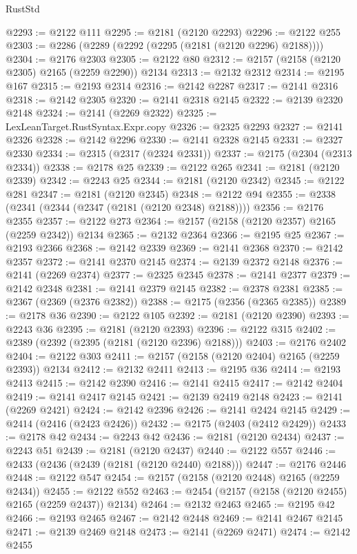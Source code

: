 \begin{lexlean}{RustStd}
\begin{coremodule}
@2293 := @2122 @111
@2295 := @2181 (@2120 @2293)
@2296 := @2122 @255
@2303 := @2286 (@2289 (@2292 (@2295 (@2181 (@2120 @2296) @2188))))
@2304 := @2176 @2303
@2305 := @2122 @80
@2312 := @2157 (@2158 (@2120 @2305) @2165 (@2259 @2290)) @2134
@2313 := @2132 @2312
@2314 := @2195 @167
@2315 := @2193 @2314
@2316 := @2142 @2287
@2317 := @2141 @2316
@2318 := @2142 @2305
@2320 := @2141 @2318 @2145
@2322 := @2139 @2320 @2148
@2324 := @2141 (@2269 @2322)
@2325 := LexLeanTarget.RustSyntax.Expr.copy
@2326 := @2325 @2293
@2327 := @2141 @2326
@2328 := @2142 @2296
@2330 := @2141 @2328 @2145
@2331 := @2327 @2330
@2334 := @2315 (@2317 (@2324 @2331))
@2337 := @2175 (@2304 (@2313 @2334))
@2338 := @2178 @25
@2339 := @2122 @265
@2341 := @2181 (@2120 @2339)
@2342 := @2243 @25
@2344 := @2181 (@2120 @2342)
@2345 := @2122 @281
@2347 := @2181 (@2120 @2345)
@2348 := @2122 @94
@2355 := @2338 (@2341 (@2344 (@2347 (@2181 (@2120 @2348) @2188))))
@2356 := @2176 @2355
@2357 := @2122 @273
@2364 := @2157 (@2158 (@2120 @2357) @2165 (@2259 @2342)) @2134
@2365 := @2132 @2364
@2366 := @2195 @25
@2367 := @2193 @2366
@2368 := @2142 @2339
@2369 := @2141 @2368
@2370 := @2142 @2357
@2372 := @2141 @2370 @2145
@2374 := @2139 @2372 @2148
@2376 := @2141 (@2269 @2374)
@2377 := @2325 @2345
@2378 := @2141 @2377
@2379 := @2142 @2348
@2381 := @2141 @2379 @2145
@2382 := @2378 @2381
@2385 := @2367 (@2369 (@2376 @2382))
@2388 := @2175 (@2356 (@2365 @2385))
@2389 := @2178 @36
@2390 := @2122 @105
@2392 := @2181 (@2120 @2390)
@2393 := @2243 @36
@2395 := @2181 (@2120 @2393)
@2396 := @2122 @315
@2402 := @2389 (@2392 (@2395 (@2181 (@2120 @2396) @2188)))
@2403 := @2176 @2402
@2404 := @2122 @303
@2411 := @2157 (@2158 (@2120 @2404) @2165 (@2259 @2393)) @2134
@2412 := @2132 @2411
@2413 := @2195 @36
@2414 := @2193 @2413
@2415 := @2142 @2390
@2416 := @2141 @2415
@2417 := @2142 @2404
@2419 := @2141 @2417 @2145
@2421 := @2139 @2419 @2148
@2423 := @2141 (@2269 @2421)
@2424 := @2142 @2396
@2426 := @2141 @2424 @2145
@2429 := @2414 (@2416 (@2423 @2426))
@2432 := @2175 (@2403 (@2412 @2429))
@2433 := @2178 @42
@2434 := @2243 @42
@2436 := @2181 (@2120 @2434)
@2437 := @2243 @51
@2439 := @2181 (@2120 @2437)
@2440 := @2122 @557
@2446 := @2433 (@2436 (@2439 (@2181 (@2120 @2440) @2188)))
@2447 := @2176 @2446
@2448 := @2122 @547
@2454 := @2157 (@2158 (@2120 @2448) @2165 (@2259 @2434))
@2455 := @2122 @552
@2463 := @2454 (@2157 (@2158 (@2120 @2455) @2165 (@2259 @2437)) @2134)
@2464 := @2132 @2463
@2465 := @2195 @42
@2466 := @2193 @2465
@2467 := @2142 @2448
@2469 := @2141 @2467 @2145
@2471 := @2139 @2469 @2148
@2473 := @2141 (@2269 @2471)
@2474 := @2142 @2455

\end{coremodule}
\end{lexlean}
